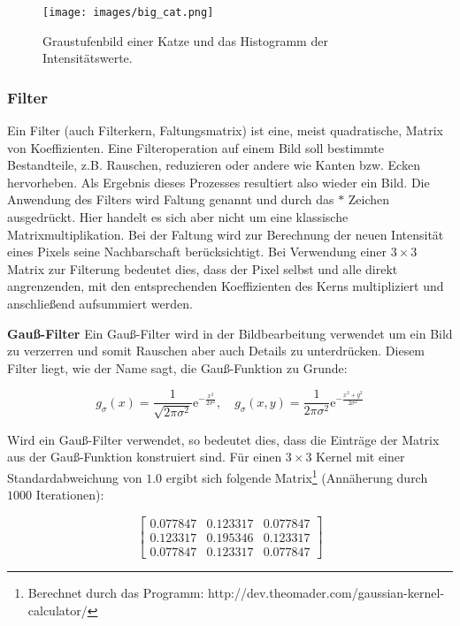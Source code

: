 \begin{figure}
	\centering
	\texttt{[image: images/big\_cat.png]}
	\caption[Graustufenbild einer Katze und das Histogramm der Intensitätswerte.]{Graustufenbild einer Katze{\footnotemark} und das Histogramm der Intensitätswerte.}
	\label{img:hist}
\end{figure}


\subsubsection{Filter} 
Ein Filter (auch Filterkern, Faltungsmatrix) ist eine, meist quadratische, Matrix von Koeffizienten. Eine Filteroperation auf einem Bild soll bestimmte Bestandteile, z.B. Rauschen, reduzieren oder andere wie Kanten bzw. Ecken hervorheben. Als Ergebnis dieses Prozesses resultiert also wieder ein Bild. Die Anwendung des Filters wird Faltung genannt und durch das $*$ Zeichen ausgedrückt. Hier handelt es sich aber nicht um eine klassische Matrixmultiplikation. Bei der Faltung wird zur Berechnung der neuen Intensität eines Pixels seine Nachbarschaft berücksichtigt. Bei Verwendung einer $3 \times 3$ Matrix zur Filterung bedeutet dies, dass der Pixel selbst und alle direkt angrenzenden, mit den entsprechenden Koeffizienten des Kerns multipliziert und anschließend aufsummiert werden. 

\textbf{Gauß-Filter}
Ein Gauß-Filter wird in der Bildbearbeitung verwendet um ein Bild zu verzerren und somit Rauschen aber auch Details zu unterdrücken. Diesem Filter liegt, wie der Name sagt, die Gauß-Funktion zu Grunde:

$$
g_{\sigma}(x)=\frac{1}{\sqrt{2\pi\sigma^{2}}}\mathrm{e}^{-\frac{x^{2}}{2\sigma^{2}}}, \quad g_{\sigma}(x, y) = \frac{1}{2\pi\sigma^{2}}\mathrm{e}^{-\frac{x^{2} + y^{2}}{2\sigma^{2}}}
$$

Wird ein Gauß-Filter verwendet, so bedeutet dies, dass die Einträge der Matrix aus der Gauß-Funktion konstruiert sind. Für einen $3 \times 3$ Kernel mit einer Standardabweichung von $1.0$ ergibt sich folgende Matrix\footnote{Berechnet durch das Programm: http://dev.theomader.com/gaussian-kernel-calculator/} (Annäherung durch $1000$ Iterationen):

$$
\begin{bmatrix}
0.077847	& 0.123317	& 0.077847	\\
0.123317	& 0.195346	& 0.123317	\\
0.077847	& 0.123317	& 0.077847
\end{bmatrix}
$$ 

